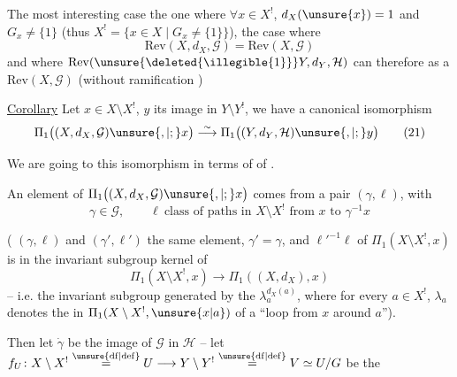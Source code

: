 
The most interesting case 
the one where  $\forall x\in X^{!}$, 
$d_X(\unsure{x})=1$ and $G_x\ne\{1\}$
(thus $X^{!}=\{x\in X\mid G_x\ne\{1\}\}$),  the case where
\[
\mathrm{Rev}(X,d_X,\mathcal G)=\mathrm{Rev}(X,\mathcal G) \tag{20}
\]
and where $\mathrm{Rev}(\unsure{\deleted{\illegible{1}}}Y,d_Y,\mathcal H)$ can therefore
 as a $\mathrm{Rev}(X,\mathcal G)$
(without ramification )



\uline{Corollary} Let $x\in X\setminus X^{!}$, $y$ its image in
$Y\setminus Y^{!}$, we have a canonical isomorphism
\[
\Pi_1\bigl((X,d_X,\mathcal G)\unsure{,|;}x\bigr)
\overset{\sim}{\longrightarrow}
\Pi_1\bigl((Y,d_Y,\mathcal H)\unsure{,|;}y\bigr) \tag{21}
\]

We are going to  this isomorphism in terms of
 of .

An element\inserted{$\alpha$} of
$\Pi_1\bigl((X,d_X,\mathcal G)\unsure{,|;}x\bigr)$
comes from a pair $(\gamma,\ell)$, with
\[
\gamma\in\mathcal G,\qquad
\ell\ \text{class of paths in }X\setminus X^{!}
\text{ from }x\text{ to }\gamma^{-1}x
\]

( $(\gamma,\ell)$ and $(\gamma',\ell')$  the
same element,  $\gamma'=\gamma$, and
 $\ell'^{-1}\ell$ of $\Pi_1(X\setminus X^{!},x)$ is
in the invariant subgroup kernel of
\[
\Pi_1(X\setminus X^{!},x)\longrightarrow\Pi_1((X,d_X),x)
\]
-- i.e. the invariant subgroup generated by the
 $\lambda_a^{d_X(a)}$, where
for every $a\in X^{!}$, $\lambda_a$ denotes the  in
$\Pi_1(X\setminus X^{!},\unsure{x|a})$ of a ``loop from $x$ around $a$'').

Then let $\dot\gamma$ be the image of $\mathcal G$ in $\mathcal H$ --
 let
$f_U\colon X\setminus X^{!}\overset{\unsure{\mathrm{df}|\mathrm{def}}}{=}U
\longrightarrow Y\setminus Y^{!}\overset{\unsure{\mathrm{df}|\mathrm{def}}}{=}V
\simeq U/G$ be the 

